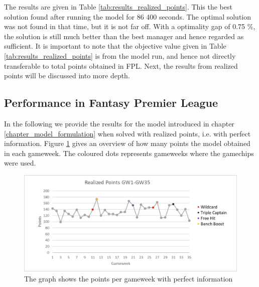 The results are given in Table \ref{tab:results_realized_points}. This the best solution found after running the model for 86 400 seconds. The optimal solution was not found in that time, but it is not far off. With a optimality gap of 0.75 \%, the solution is still much better than the best manager and hence regarded as sufficient. It is important to note that the objective value given in
Table \ref{tab:results_realized_points} is from the model run, and hence not directly transferable to total points obtained in FPL. Next, the results from realized points will be discussed into more depth. 



\subsection{Performance in Fantasy Premier League}
In the following we provide the results for the model introduced in chapter \ref{chapter_model_formulation} when solved with realized points, i.e. with perfect information. Figure \ref{Figure_Realized_points} gives an overview of how many points the model obtained in each gameweek. The coloured dots represents gameweeks where the gamechips were used. 

\begin{figure}[H]
\label{fig:Realized_points}
    \centering
    \includegraphics[scale=0.75]{fig/chapter_7/RealizedPoints_colour.png}
    \caption{The graph shows the points per gameweek with perfect information}
\label{Figure_Realized_points}    
\end{figure}

